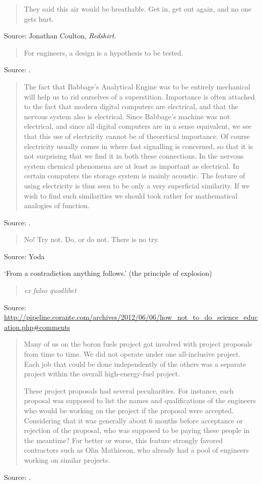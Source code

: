 \documentclass[a4paper]{article}
\begin{document}
\begin{quote}
	They said this air would be breathable.  Get in, get out again, and no one gets hurt.
\end{quote}
Source: Jonathan Coulton, \emph{Redshirt}.
\medskip

\begin{quote}
	For engineers, a design is a hypothesis to be tested.
\end{quote}
Source: \cite[p.~109, but see note 105 on page 487, where the author is apparently quoting Petroski
\cite{Petroski1985}]{Vaughan1996}.
\medskip

\begin{quote}
	The fact that Babbage's Analytical Engine was to be entirely mechanical will help us to
rid ourselves of a superstition.  Importance is often attached to the fact that modern digital
computers are electrical, and that the nervous system also is electrical.  Since Babbage's
machine was not electrical, and since all digital computers are in a sense equivalent, we see
that this use of electricity cannot be of theoretical importance.  Of course electricity usually
comes in where fast signalling is concerned, so that it is not surprising that we find it in
both these connections.  In the nervous system chemical phenomena are at least as important as
electrical.  In certain computers the storage system is mainly acoustic.  The feature of using
electricity is thus seen to be only a very superficial similarity.  If we wish to find such
similarities we should took rather for mathematical analogies of function.
\end{quote}
Source: \cite[p.~439]{Turing1950}.
\medskip

\begin{quote}
	No!  Try not.  Do, or do not.  There is no try.
\end{quote}
Source: Yoda
\medskip

`From a contradiction anything follows.' (the principle of explosion)
\begin{quote}
	\emph{ex falso quodlibet}
\end{quote}
Source:
\url{http://pipeline.corante.com/archives/2012/06/06/how_not_to_do_science_education.php#comments}
\medskip

\begin{quotation}
	Many of us on the boron fuels project got involved with project proposals from time to time.
We did not operate under one all-inclusive project.  Each job that could be done independently of
the others was a separate project within the overall high-energy-fuel project.

	These project proposals had several peculiarities.  For instance, each proposal was supposed to
list the names and qualifications of the engineers who would be working on the project if the
proposal were accepted.  Considering that it was generally about 6 months before acceptance or
rejection of the proposal, who was supposed to be paying these people in the meantime?  For better
or worse, this feature strongly favored contractors such as Olin Mathieson, who already had a pool
of engineers working on similar projects.
\end{quotation}
Source: \cite[p.~202]{Dequasie1991}.
\medskip
\end{document}

